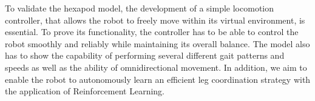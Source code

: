 To validate the hexapod model, the development of a simple locomotion controller, that allows the robot to freely move within its virtual environment, is essential.
To prove its functionality, the controller has to be able to control the robot smoothly and reliably while maintaining its overall balance.
The model also has to show the capability of performing several different gait patterns and speeds as well as the ability of omnidirectional movement.
In addition, we aim to enable the robot to autonomously learn an efficient leg coordination strategy with the application of Reinforcement Learning.




